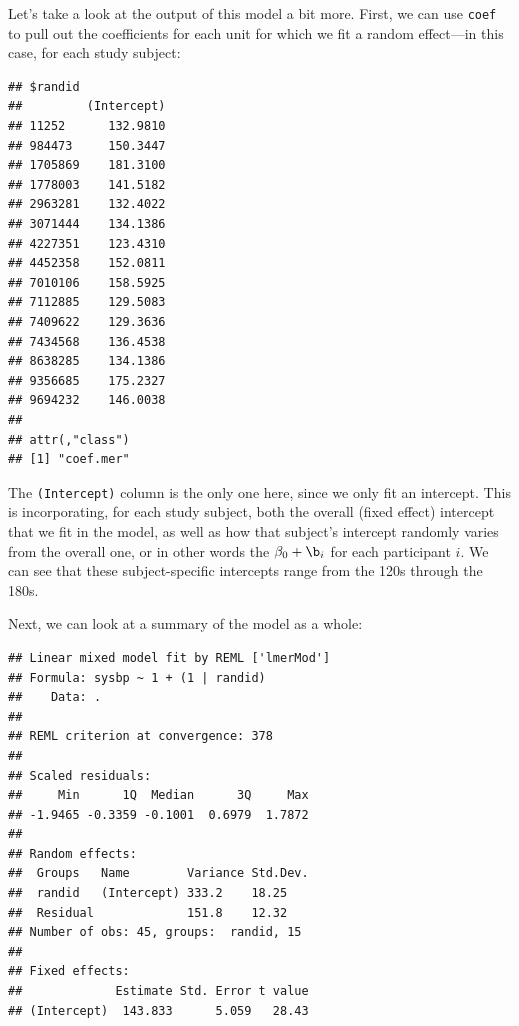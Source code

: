 \documentclass[
]{book}
\newenvironment{Shaded}{\begin{snugshade}}{\end{snugshade}}
\newcommand{\KeywordTok}[1]{\textcolor[rgb]{0.13,0.29,0.53}{\textbf{#1}}}
\newcommand{\NormalTok}[1]{#1}
\newcommand{\OperatorTok}[1]{\textcolor[rgb]{0.81,0.36,0.00}{\textbf{#1}}}
\newcommand{\StringTok}[1]{\textcolor[rgb]{0.31,0.60,0.02}{#1}}
\begin{document}
Let's take a look at the output of this model a bit more. First, we can use
\texttt{coef} to pull out the coefficients for each unit for which we fit a random
effect---in this case, for each study subject:

\begin{Shaded}
\end{Shaded}

\begin{verbatim}
## $randid
##         (Intercept)
## 11252      132.9810
## 984473     150.3447
## 1705869    181.3100
## 1778003    141.5182
## 2963281    132.4022
## 3071444    134.1386
## 4227351    123.4310
## 4452358    152.0811
## 7010106    158.5925
## 7112885    129.5083
## 7409622    129.3636
## 7434568    136.4538
## 8638285    134.1386
## 9356685    175.2327
## 9694232    146.0038
## 
## attr(,"class")
## [1] "coef.mer"
\end{verbatim}

The \texttt{(Intercept)} column is the only one here, since we only fit an intercept.
This is incorporating, for each study subject, both the overall (fixed effect)
intercept that we fit in the model, as well as how that subject's intercept
randomly varies from the overall one, or in other words the \(\beta_{0} + \b_{i}\)
for each participant \(i\). We can see that these subject-specific intercepts
range from the 120s through the 180s.

Next, we can look at a summary of the model as a whole:

\begin{Shaded}
\end{Shaded}

\begin{verbatim}
## Linear mixed model fit by REML ['lmerMod']
## Formula: sysbp ~ 1 + (1 | randid)
##    Data: .
## 
## REML criterion at convergence: 378
## 
## Scaled residuals: 
##     Min      1Q  Median      3Q     Max 
## -1.9465 -0.3359 -0.1001  0.6979  1.7872 
## 
## Random effects:
##  Groups   Name        Variance Std.Dev.
##  randid   (Intercept) 333.2    18.25   
##  Residual             151.8    12.32   
## Number of obs: 45, groups:  randid, 15
## 
## Fixed effects:
##             Estimate Std. Error t value
## (Intercept)  143.833      5.059   28.43
\end{verbatim}
\end{document}

